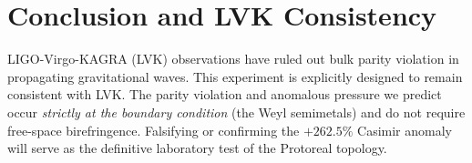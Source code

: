 \section{Conclusion and LVK Consistency}\label{sec:conclusion}
LIGO-Virgo-KAGRA (LVK) observations have ruled out bulk parity violation in propagating gravitational waves. This experiment is explicitly designed to remain consistent with LVK. The parity violation and anomalous pressure we predict occur \emph{strictly at the boundary condition} (the Weyl semimetals) and do not require free-space birefringence. Falsifying or confirming the $+262.5\%$ Casimir anomaly will serve as the definitive laboratory test of the Protoreal topology.

